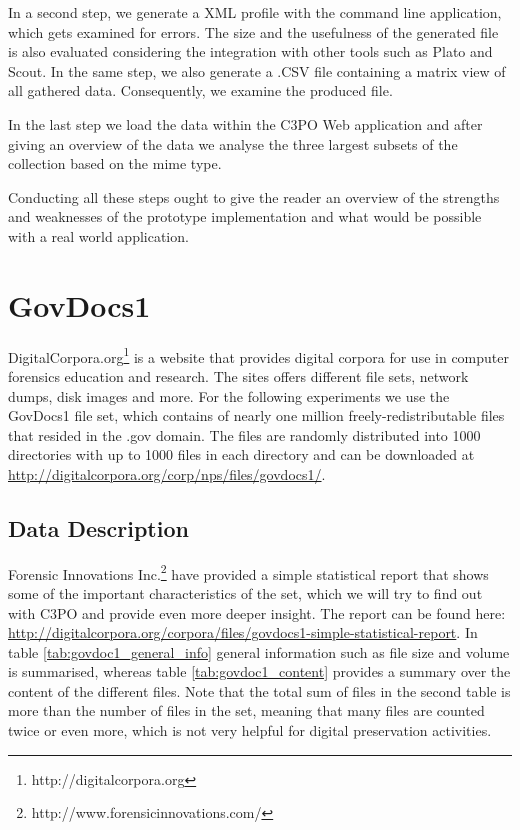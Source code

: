 In a second step, we generate a XML profile with the command line application, which gets examined for errors. The size and the usefulness of the generated file is also evaluated considering the integration with other tools such as Plato and Scout. In the same step, we also generate a .CSV file containing a matrix view of all gathered data. Consequently, we examine the produced file.

In the last step we load the data within the C3PO Web application and after giving an overview of the data we analyse the three largest subsets of the collection based on the mime type.

Conducting all these steps ought to give the reader an overview of the strengths and weaknesses of the prototype implementation and what would be possible with a real world application.

\section{GovDocs1}
DigitalCorpora.org\footnote{http://digitalcorpora.org} is a website that provides digital corpora for use in computer forensics education and research.
The sites offers different file sets, network dumps, disk images and more.
For the following experiments we use the GovDocs1 file set, which contains of nearly one million freely-redistributable files that resided in the .gov domain.
The files are randomly distributed into 1000 directories with up to 1000 files in each directory and can be downloaded at \url{http://digitalcorpora.org/corp/nps/files/govdocs1/}.

\subsection{Data Description}
Forensic Innovations Inc.\footnote{http://www.forensicinnovations.com/} have provided a simple statistical report that shows some of the important characteristics of the set, which we will try to find out with C3PO and provide even more deeper insight.
The report can be found here: \url{http://digitalcorpora.org/corpora/files/govdocs1-simple-statistical-report}.
In table \ref{tab:govdoc1_general_info} general information such as file size and volume is summarised, whereas table \ref{tab:govdoc1_content} provides a summary over the content of the different files.
Note that the total sum of files in the second table is more than the number of files in the set, meaning that many files are counted twice or even more, which is not very helpful for digital preservation activities.


